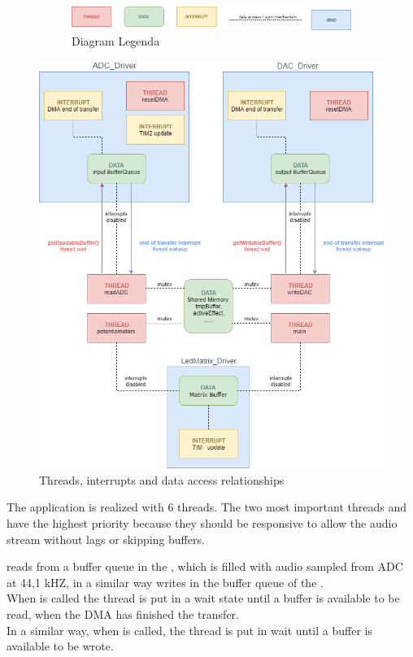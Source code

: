\begin{figure}[H]
    \begin{figure}[H]
    \centering
        \includegraphics[width=\textwidth]{img/legenda.png}
        \caption{Diagram Legenda}
    \end{figure}
        
    \centering
        \includegraphics[width=\textwidth]{img/threads_.png}
        \caption{Threads, interrupts and data access relationships}
\end{figure}
        
\newpage

The application is realized with 6 threads.
The two most important threads  and  have the highest priority because they should be responsive to allow the audio stream without lags or skipping buffers.\par
{} reads from a buffer queue in the , which is filled with audio sampled from ADC at 44,1 kHZ, in a similar way  writes in the buffer queue of the .\\
When  is called the  thread is put in a wait state until a buffer is available to be read, when the DMA has finished the transfer.\\
In a similar way, when  is called, the  thread is put in wait until a buffer is available to be wrote. \par

